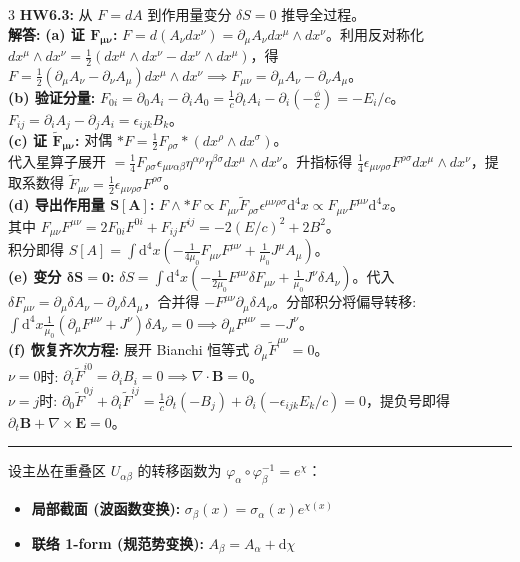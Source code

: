 \documentclass[9pt,a4paper]{article} %
\newcommand{\p}{\partial}
\newcommand{\diff}{\mathrm{d}}
\newcommand{\mbf}[1]{\mathbf{#1}}
\begin{document}
\begin{multicols*}{3}
\noindent\textbf{HW6.3:} 从 $F=dA$ 到作用量变分 $\delta S=0$ 推导全过程。\\
\textbf{解答:} 
\textbf{(a) 证 $\mathbf{F_{\mu\nu}}$:} $F = d(A_\nu dx^\nu) = \p_\mu A_\nu dx^\mu \wedge dx^\nu$。利用反对称化 $dx^\mu \wedge dx^\nu = \frac{1}{2}(dx^\mu \wedge dx^\nu - dx^\nu \wedge dx^\mu)$，得 $F = \frac{1}{2}(\p_\mu A_\nu - \p_\nu A_\mu)dx^\mu \wedge dx^\nu \implies F_{\mu\nu} = \p_\mu A_\nu - \p_\nu A_\mu$。\\
\textbf{(b) 验证分量:} 
$F_{0i} = \p_0 A_i - \p_i A_0 = \frac{1}{c}\p_t A_i - \p_i(-\frac{\phi}{c}) = -E_i/c$。
$F_{ij} = \p_i A_j - \p_j A_i = \epsilon_{ijk}B_k$。\\
\textbf{(c) 证 $\mathbf{\tilde{F}_{\mu\nu}}$:} 对偶 $*F = \frac{1}{2} F_{\rho\sigma} *(dx^\rho \wedge dx^\sigma)$。\\
代入星算子展开 $= \frac{1}{4} F_{\rho\sigma} \epsilon_{\mu\nu\alpha\beta}\eta^{\alpha\rho}\eta^{\beta\sigma} dx^\mu \wedge dx^\nu$。升指标得 $\frac{1}{4}\epsilon_{\mu\nu\rho\sigma}F^{\rho\sigma} dx^\mu\wedge dx^\nu$，提取系数得 $\tilde{F}_{\mu\nu} = \frac{1}{2}\epsilon_{\mu\nu\rho\sigma}F^{\rho\sigma}$。\\
\textbf{(d) 导出作用量 $\mathbf{S[A]}$:} $F \wedge *F \propto F_{\mu\nu}\tilde{F}_{\rho\sigma}\epsilon^{\mu\nu\rho\sigma}\diff^4x \propto F_{\mu\nu}F^{\mu\nu}\diff^4x$。\\
其中 $F_{\mu\nu}F^{\mu\nu} = 2F_{0i}F^{0i} + F_{ij}F^{ij} = -2(E/c)^2 + 2B^2$。\\
积分即得 $S[A] = \int \diff^4x \left( -\frac{1}{4\mu_0} F_{\mu\nu}F^{\mu\nu} + \frac{1}{\mu_0} J^\mu A_\mu \right)$。\\
\textbf{(e) 变分 $\mathbf{\delta S=0}$:} $\delta S = \int \diff^4x \left( -\frac{1}{2\mu_0} F^{\mu\nu}\delta F_{\mu\nu} + \frac{1}{\mu_0} J^\nu \delta A_\nu \right)$。代入 $\delta F_{\mu\nu} = \p_\mu\delta A_\nu - \p_\nu\delta A_\mu$，合并得 $-F^{\mu\nu}\p_\mu\delta A_\nu$。分部积分将偏导转移: $\int \diff^4x \frac{1}{\mu_0}(\p_\mu F^{\mu\nu} + J^\nu)\delta A_\nu = 0 \implies \p_\mu F^{\mu\nu} = -J^\nu$。\\
\textbf{(f) 恢复齐次方程:} 展开 Bianchi 恒等式 $\p_\mu \tilde{F}^{\mu\nu} = 0$。\\
$\nu=0$时: $\p_i \tilde{F}^{i0} = \p_i B_i = 0 \implies \nabla\cdot\mbf{B}=0$。\\
$\nu=j$时: $\p_0 \tilde{F}^{0j} + \p_i \tilde{F}^{ij} = \frac{1}{c}\p_t(-B_j) + \p_i(-\epsilon_{ijk}E_k/c) = 0$，提负号即得 $\p_t\mbf{B} + \nabla\times\mbf{E}=0$。

\vspace{1ex}\hrule\vspace{1ex}
设主丛在重叠区 $U_{\alpha\beta}$ 的转移函数为 $\varphi_\alpha \circ \varphi_\beta^{-1} = e^\chi$：
\begin{itemize}
    \item \textbf{局部截面 (波函数变换):} $\sigma_\beta(x) = \sigma_\alpha(x)e^{\chi(x)}$
    \item \textbf{联络 1-form (规范势变换):} $A_\beta = A_\alpha + \diff\chi$
\end{itemize}


\end{multicols*}
\end{document}
